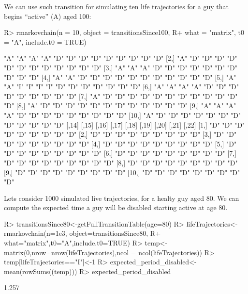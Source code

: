 \documentclass[
  nojss]{jss}
\begin{document}
We can use such transition for simulating ten life trajectories for a guy that begins ``active'' (A) aged 100:

\begin{CodeChunk}

\begin{CodeInput}
R> rmarkovchain(n = 10, object = transitionsSince100,
R+              what = "matrix", t0 = "A", include.t0 = TRUE)
\end{CodeInput}

\begin{CodeOutput}
      [,1] [,2] [,3] [,4] [,5] [,6] [,7] [,8] [,9] [,10] [,11] [,12] [,13]
 [1,] "A"  "A"  "A"  "A"  "D"  "D"  "D"  "D"  "D"  "D"   "D"   "D"   "D"  
 [2,] "A"  "D"  "D"  "D"  "D"  "D"  "D"  "D"  "D"  "D"   "D"   "D"   "D"  
 [3,] "A"  "A"  "A"  "D"  "D"  "D"  "D"  "D"  "D"  "D"   "D"   "D"   "D"  
 [4,] "A"  "A"  "D"  "D"  "D"  "D"  "D"  "D"  "D"  "D"   "D"   "D"   "D"  
 [5,] "A"  "A"  "I"  "I"  "I"  "I"  "D"  "D"  "D"  "D"   "D"   "D"   "D"  
 [6,] "A"  "A"  "A"  "A"  "D"  "D"  "D"  "D"  "D"  "D"   "D"   "D"   "D"  
 [7,] "A"  "D"  "D"  "D"  "D"  "D"  "D"  "D"  "D"  "D"   "D"   "D"   "D"  
 [8,] "A"  "D"  "D"  "D"  "D"  "D"  "D"  "D"  "D"  "D"   "D"   "D"   "D"  
 [9,] "A"  "A"  "A"  "A"  "D"  "D"  "D"  "D"  "D"  "D"   "D"   "D"   "D"  
[10,] "A"  "D"  "D"  "D"  "D"  "D"  "D"  "D"  "D"  "D"   "D"   "D"   "D"  
      [,14] [,15] [,16] [,17] [,18] [,19] [,20] [,21] [,22]
 [1,] "D"   "D"   "D"   "D"   "D"   "D"   "D"   "D"   "D"  
 [2,] "D"   "D"   "D"   "D"   "D"   "D"   "D"   "D"   "D"  
 [3,] "D"   "D"   "D"   "D"   "D"   "D"   "D"   "D"   "D"  
 [4,] "D"   "D"   "D"   "D"   "D"   "D"   "D"   "D"   "D"  
 [5,] "D"   "D"   "D"   "D"   "D"   "D"   "D"   "D"   "D"  
 [6,] "D"   "D"   "D"   "D"   "D"   "D"   "D"   "D"   "D"  
 [7,] "D"   "D"   "D"   "D"   "D"   "D"   "D"   "D"   "D"  
 [8,] "D"   "D"   "D"   "D"   "D"   "D"   "D"   "D"   "D"  
 [9,] "D"   "D"   "D"   "D"   "D"   "D"   "D"   "D"   "D"  
[10,] "D"   "D"   "D"   "D"   "D"   "D"   "D"   "D"   "D"  
\end{CodeOutput}
\end{CodeChunk}

Lets consider 1000 simulated live trajectories, for a healty guy aged 80. We can compute the expected time a guy will be disabled starting active at age 80.

\begin{CodeChunk}

\begin{CodeInput}
R> transitionsSince80<-getFullTransitionTable(age=80)
R> lifeTrajectories<-rmarkovchain(n=1e3, object=transitionsSince80,
R+                                what="matrix",t0="A",include.t0=TRUE)
R> temp<-matrix(0,nrow=nrow(lifeTrajectories),ncol = ncol(lifeTrajectories))
R> temp[lifeTrajectories=="I"]<-1
R> expected_period_disabled<-mean(rowSums((temp)))
R> expected_period_disabled
\end{CodeInput}

\begin{CodeOutput}
[1] 1.257
\end{CodeOutput}
\end{CodeChunk}
\end{document}
